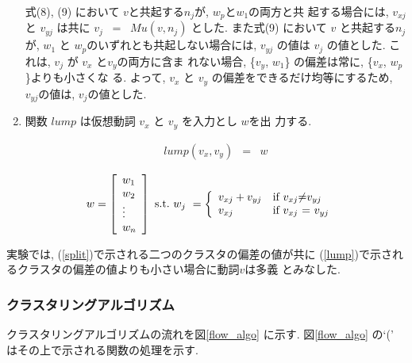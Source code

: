 \begin{enumerate}
式(8), (9) において $v$と共起する$n_{j}$が, $w_{p}$と$w_{1}$の両方と共
起する場合には, $v_{xj}$ と $v_{yj}$ は共に $v_{j}$ \ = \
$Mu(v,n_{j})$ とした. また式(9) において $v$ と共起する$n_{j}$ が,
$w_{1}$ と $w_{p}$のいずれとも共起しない場合には, $v_{yj}$ の値は 
$v_{j}$ の値とした.  これは, $v_{j}$ が $v_{x}$ と$v_{y}$の両方に含ま
れない場合, \{$v_{y}$, $w_{1}$\} の偏差は常に, \{$v_{x}$, $w_{p}$\}よりも小さくな
る.  よって, $v_{x}$ と $v_{y}$ の偏差をできるだけ均等にするため,
$v_{yj}$の値は, $v_{j}$の値とした.

\item 関数 $lump$ は仮想動詞 $v_{x}$ と $v_{y}$ を入力とし $w$を出
力する.


\vspace*{-5mm} 
\begin{eqnarray}
lump(v_{x}, v_{y}) & = & w \label{lu}
\end{eqnarray}

\vspace*{-7mm} 
\begin{equation}
\hspace*{-3mm}  w = \left[ \begin{array}{l}
		w_{1} \\
		w_{2} \\
		\vdots \\
		w_{n} 
		\end{array} \right] \ \hbox{s.t.} \ w_{j}
\ = \left\{ \begin{array}{ll}
	v_{xj} + v_{yj}   &\mbox{if $v_{xj}$$\neq$$v_{yj}$} \\
	v_{xj}  & \mbox{if $v_{xj}$ = $v_{yj}$}
	\end{array}
           \right. 
\end{equation}

\end{enumerate}

\noindent
実験では, (\ref{split})で示される二つのクラスタの偏差の値が共に
(\ref{lump})で示されるクラスタの偏差の値よりも小さい場合に動詞$v$は多義
とみなした.


\subsubsection{クラスタリングアルゴリズム}


クラスタリングアルゴリズムの流れを図\ref{flow_algo} に示す.  図\ref{flow_algo} の`('
はその上で示される関数の処理を示す.

